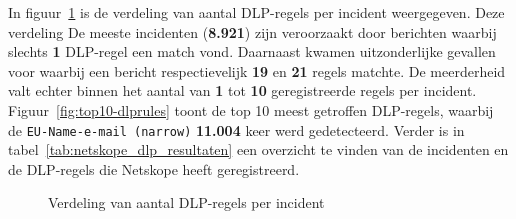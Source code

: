 In figuur~\ref{fig:dlp-incidents-per-rule} is de verdeling van aantal DLP-regels per incident weergegeven.
Deze verdeling 
De meeste incidenten (\textbf{8.921}) zijn veroorzaakt door berichten waarbij slechts \textbf{1} DLP-regel een match vond.
Daarnaast kwamen uitzonderlijke gevallen voor waarbij een bericht respectievelijk \textbf{19} en \textbf{21} regels matchte.
De meerderheid valt echter binnen het aantal van \textbf{1} tot \textbf{10} geregistreerde regels per incident.
Figuur~\ref{fig:top10-dlprules} toont de top 10 meest getroffen DLP-regels, waarbij de \texttt{EU-Name-e-mail (narrow)} \textbf{11.004} keer werd gedetecteerd.
Verder is in tabel~\ref{tab:netskope_dlp_resultaten} een overzicht te vinden van de incidenten en de DLP-regels die Netskope heeft geregistreerd.

 

\begin{figure}[H]
  \centering
  \footnotesize %
  \caption{Verdeling van aantal DLP-regels per incident}
  \label{fig:dlp-incidents-per-rule}
\end{figure}

